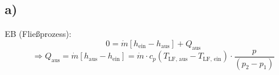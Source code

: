 

\subsection*{a)}
EB (Fließprozess):
\[
0 = \dot{m} \left[ h_{\text{ein}} - h_{\text{aus}} \right] + Q_{\text{aus}}
\]
\[
\Rightarrow Q_{\text{aus}} = \dot{m} \left[ h_{\text{aus}} - h_{\text{ein}} \right] = \dot{m} \cdot c_p \left( T_{\text{LF, aus}} - T_{\text{LF, ein}} \right) \cdot \frac{p}{\left( p_2 - p_1 \right)}
\]